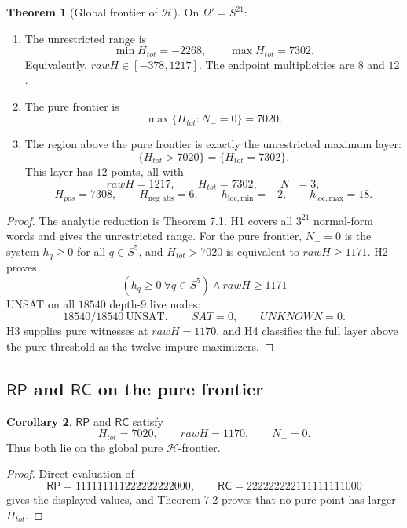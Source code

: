 \documentclass[11pt]{article}
\theoremstyle{definition}
\newtheorem{theorem}{Theorem}[section]
\newtheorem{corollary}[theorem]{Corollary}
\newcommand{\RP}{\mathsf{RP}}
\newcommand{\RC}{\mathsf{RC}}
\begin{document}
\begin{theorem}[Global frontier of \(\mathcal H\)]
\label{thm:7.2}
On
\(\Omega'=S^{21}\):

\begin{enumerate}
\def\labelenumi{\arabic{enumi}.}
\item
  The unrestricted range is \[
  \boxed{
  \min H_{tot}=-2268,
  \qquad
  \max H_{tot}=7302.
  }
  \] Equivalently, \(rawH\in[-378,1217]\). The endpoint multiplicities
  are \(8\) and \(12\).
\item
  The pure frontier is \[
  \boxed{
  \max\{H_{tot}:N_-=0\}=7020.
  }
  \]
\item
  The region above the pure frontier is exactly the unrestricted maximum
  layer: \[
  \boxed{
  \{H_{tot}>7020\}=\{H_{tot}=7302\}.
  }
  \] This layer has \(12\) points, all with \[
  rawH=1217,
  \qquad H_{tot}=7302,
  \qquad N_-=3,
  \] \[
  H_{pos}=7308,
  \qquad H_{\mathrm{neg\_abs}}=6,
  \qquad h_{\mathrm{loc,min}}=-2,
  \qquad h_{\mathrm{loc,max}}=18.
  \]
\end{enumerate}
\end{theorem}

\begin{proof}
The analytic reduction is Theorem 7.1. H1 covers all
\(3^{21}\) normal-form words and gives the unrestricted range. For the
pure frontier, \(N_-=0\) is the system \(h_q\ge0\) for all \(q\in S^5\),
and \(H_{tot}>7020\) is equivalent to \(rawH\ge1171\). H2 proves \[
(h_q\ge0\ \forall q\in S^5)\wedge rawH\ge1171
\] UNSAT on all \(18540\) depth-9 live nodes: \[
18540/18540\ \mathrm{UNSAT},
\qquad SAT=0,
\qquad UNKNOWN=0.
\] H3 supplies pure witnesses at \(rawH=1170\), and H4 classifies the
full layer above the pure threshold as the twelve impure maximizers.
\end{proof}

\subsection{\texorpdfstring{\(\RP\) and \(\RC\) on the pure frontier}{RP and RC on the pure frontier}}\label{rp-and-rc-on-the-pure-frontier}

\begin{corollary}
\label{cor:7.3}
\(\RP\) and \(\RC\) satisfy \[
H_{tot}=7020,
\qquad rawH=1170,
\qquad N_-=0.
\] Thus both lie on the global pure \(\mathcal H\)-frontier.
\end{corollary}

\begin{proof}
Direct evaluation of \[
\RP=111111111222222222000,
\qquad
\RC=222222222111111111000
\] gives the displayed values, and Theorem 7.2 proves that no pure point
has larger \(H_{tot}\).
\end{proof}
\end{document}
